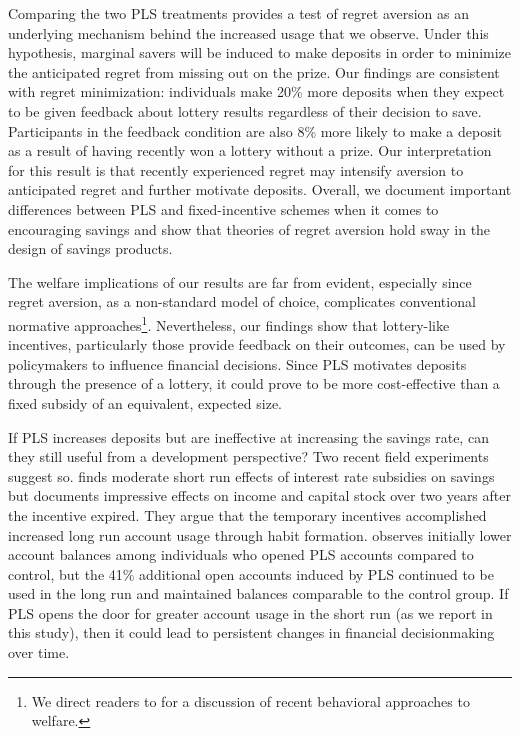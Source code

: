 \documentclass[11pt]{article}
\begin{document}
	Comparing the two PLS treatments provides a test of regret aversion as an underlying mechanism behind the increased usage that we observe. Under this hypothesis, marginal savers will be induced to make deposits in order to minimize the anticipated regret from missing out on the prize. Our findings are consistent with regret minimization: individuals make 20\% more deposits when they expect to be given feedback about lottery results regardless of their decision to save. Participants in the feedback condition are also 8\% more likely to make a deposit as a result of having recently won a lottery without a prize. Our interpretation for this result is that recently experienced regret may intensify aversion to anticipated regret and further motivate deposits. Overall, we document important differences between PLS and fixed-incentive schemes when it comes to encouraging savings and show that theories of regret aversion hold sway in the design of savings products.

	The welfare implications of our results are far from evident, especially since regret aversion, as a non-standard model of choice, complicates conventional normative approaches\footnote{We direct readers to \textcite{bernheim_behavioral_2009} for a discussion of recent behavioral approaches to welfare.}. Nevertheless, our findings show that lottery-like incentives, particularly those provide feedback on their outcomes, can be used by policymakers to influence financial decisions. Since PLS motivates deposits through the presence of a lottery, it could prove to be more cost-effective than a fixed subsidy of an equivalent, expected size.

	If PLS increases deposits but are ineffective at increasing the savings rate, can they still useful from a development perspective? Two recent field experiments suggest so. \textcite{schaner_persistent_2018} finds moderate short run effects of interest rate subsidies on savings but documents impressive effects on income and capital stock over two years after the incentive expired. They argue that the temporary incentives accomplished increased long run account usage through habit formation. \textcite{gertler_long-term_2017} observes initially lower account balances among individuals who opened PLS accounts compared to control, but the 41\% additional open accounts induced by PLS continued to be used in the long run and maintained balances comparable to the control group. If PLS opens the door for greater account usage in the short run (as we report in this study), then it could lead to persistent changes in financial decisionmaking over time.
\end{document}
